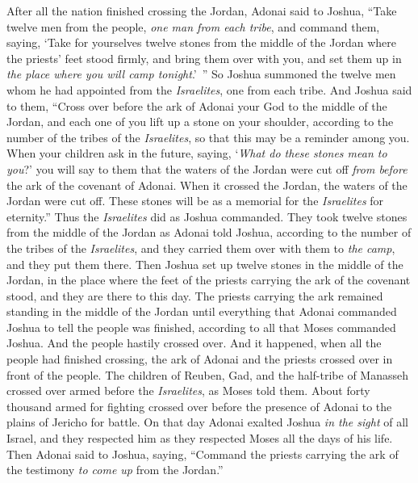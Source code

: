 \begin{biblechapter} %
 After all the nation finished crossing the Jordan, Adonai said to Joshua,
\verse “Take twelve men from the people, \textit{one man from each tribe},
\verse and command them, saying, ‘Take for yourselves twelve stones from the middle of the Jordan where the priests’ feet stood firmly, and bring them over with you, and set them up in \textit{the place where you will camp tonight}.’ ”
\verse So Joshua summoned the twelve men whom he had appointed from the \textit{Israelites}, one from each tribe.
\verse And Joshua said to them, “Cross over before the ark of Adonai your God to the middle of the Jordan, and each one of you lift up a stone on your shoulder, according to the number of the tribes of the \textit{Israelites},
\verse so that this may be a reminder among you. When your children ask in the future, saying, ‘\textit{What do these stones mean to you}?’
\verse you will say to them that the waters of the Jordan were cut off \textit{from before} the ark of the covenant of Adonai. When it crossed the Jordan, the waters of the Jordan were cut off. These stones will be as a memorial for the \textit{Israelites} for eternity.”
\verse Thus the \textit{Israelites} did as Joshua commanded. They took twelve stones from the middle of the Jordan as Adonai told Joshua, according to the number of the tribes of the \textit{Israelites}, and they carried them over with them to \textit{the camp}, and they put them there.
\verse Then Joshua set up twelve stones in the middle of the Jordan, in the place where the feet of the priests carrying the ark of the covenant stood, and they are there to this day.
\verse The priests carrying the ark remained standing in the middle of the Jordan until everything that Adonai commanded Joshua to tell the people was finished, according to all that Moses commanded Joshua. And the people hastily crossed over.
\verse And it happened, when all the people had finished crossing, the ark of Adonai and the priests crossed over in front of the people.
\verse The children of Reuben, Gad, and the half-tribe of Manasseh crossed over armed before the \textit{Israelites}, as Moses told them.
\verse About forty thousand armed for fighting crossed over before the presence of Adonai to the plains of Jericho for battle.
\verse On that day Adonai exalted Joshua \textit{in the sight} of all Israel, and they respected him as they respected Moses all the days of his life.
\verse Then Adonai said to Joshua, saying,
\verse “Command the priests carrying the ark of the testimony \textit{to come up} from the Jordan.”

\end{biblechapter}
